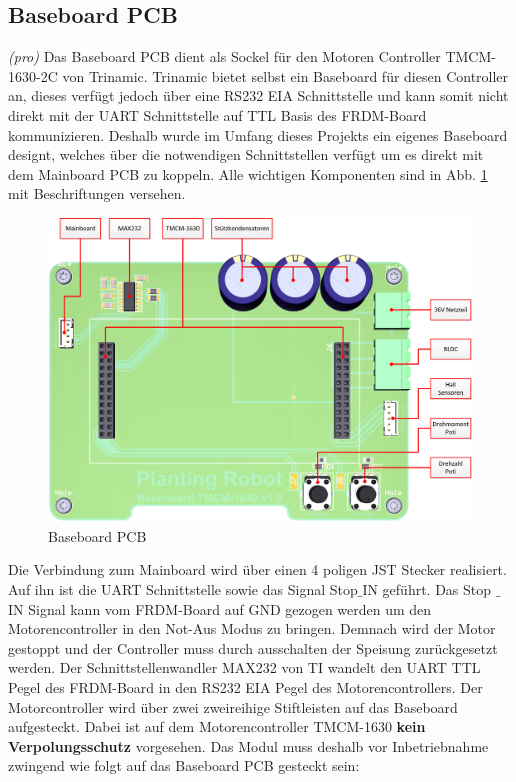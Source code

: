 \subsection{Baseboard PCB}
\textit{(pro)}
Das Baseboard PCB dient als Sockel für den Motoren Controller TMCM-1630-2C von Trinamic. Trinamic bietet selbst ein Baseboard für diesen Controller an, dieses verfügt jedoch über eine RS232 EIA Schnittstelle und kann somit nicht direkt mit der UART Schnittstelle auf TTL Basis des FRDM-Board kommunizieren. Deshalb wurde im Umfang dieses Projekts ein eigenes Baseboard designt, welches über die notwendigen Schnittstellen verfügt um es direkt mit dem Mainboard PCB zu koppeln. Alle wichtigen Komponenten sind in Abb. \ref{fig:Baseboard_3D} mit Beschriftungen versehen.

\begin{figure}[H]
	\includegraphics[width=1\textwidth]{Illustrationen/6-Umsetzung/Baseboard_3D_TOP.jpg}
	\caption{Baseboard PCB}
	\label{fig:Baseboard_3D}
\end{figure}

Die Verbindung zum Mainboard wird über einen 4 poligen JST Stecker realisiert. Auf ihn ist die UART Schnittstelle sowie das Signal Stop$\_$IN geführt. Das Stop $\_$IN Signal kann vom FRDM-Board auf GND gezogen werden um den Motorencontroller in den Not-Aus Modus zu bringen. Demnach wird der Motor gestoppt und der Controller muss durch ausschalten der Speisung zurückgesetzt werden. Der Schnittstellenwandler MAX232 von TI wandelt den UART TTL Pegel des FRDM-Board in den RS232 EIA Pegel des Motorencontrollers. Der Motorcontroller wird über zwei zweireihige Stiftleisten auf das Baseboard aufgesteckt. Dabei ist auf dem Motorencontroller TMCM-1630 \textbf{kein Verpolungsschutz} vorgesehen. Das Modul muss deshalb vor Inbetriebnahme zwingend wie folgt auf das Baseboard PCB gesteckt sein:

